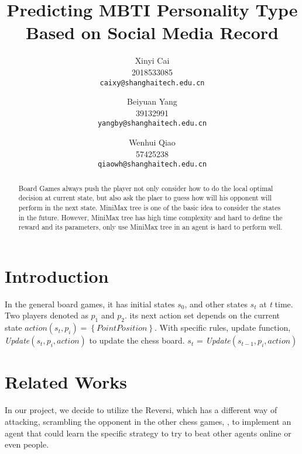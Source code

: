 \documentclass[10pt,twocolumn,letterpaper]{article}
\begin{document}
\title{Predicting MBTI Personality Type Based on Social Media Record}

\author{
Xinyi Cai\\
2018533085\\
{\tt\small caixy@shanghaitech.edu.cn}
\and
Beiyuan Yang\\
39132991\\
{\tt\small yangby@shanghaitech.edu.cn}
\and 
Wenhui Qiao\\
57425238\\
{\tt\small qiaowh@shanghaitech.edu.cn}
}

\maketitle

\begin{abstract}
   Board Games always push the player not only consider 
   how to do the local optimal decision at current 
   state, but also ask the plaer to guess  how will 
   his opponent will perform in the next state. MiniMax 
   tree is one of the basic idea to consider the states 
   in the future. However, MiniMax tree has high time 
   complexity and hard to define the reward and its 
   parameters, only use MiniMax tree in an agent is hard 
   to perform well. 
   
   
\end{abstract}

\section{Introduction}


In the general board games, it has initial states 
$s_{0}$, and other states $s_{t}$ at \emph{t} time. Two players denoted as 
$p_{1}$ and $p_{2}$. its next action set depends on the current 
state $action\left(s_{t}, p_{i}\right) = \left\{PointPosition\right\}$. 
With specific rules, update function, \emph{Update}$\left(s_{t}, p_{i}, action \right)$ to update the chess board. 
$s_{t}$ = \emph{Update}$\left(s_{t-1}, p_{i}, action \right)$


\section{Related Works}


In our project, we decide to utilize the Reversi, which 
has a different way of attacking, scrambling the opponent in the other chess games, 
 , to implement an agent that could learn the 
specific strategy to try to beat other agents online 
or even people. 
\end{document}
